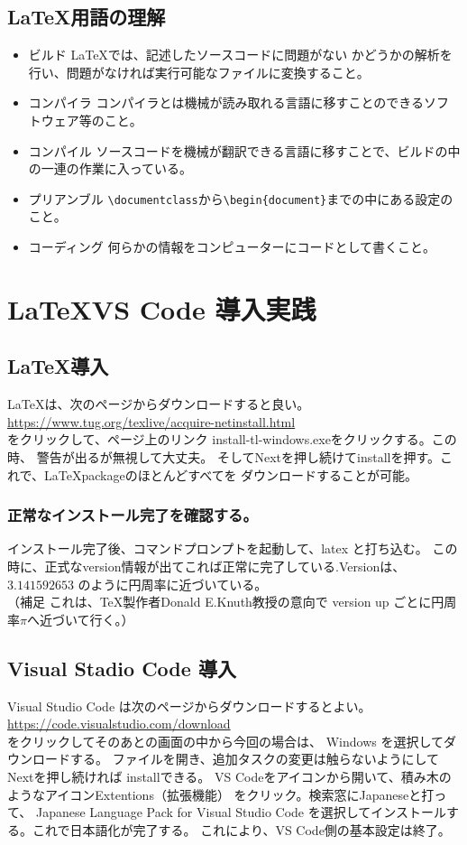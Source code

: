 \documentclass{ltjsarticle}
\begin{document}
\subsection{\LaTeX 用語の理解}
\begin{itemize}
  \item ビルド \LaTeX では、記述したソースコードに問題がない
        かどうかの解析を行い、問題がなければ実行可能なファイルに変換すること。
  \item コンパイラ コンパイラとは機械が読み取れる言語に移すことのできるソフトウェア等のこと。
  \item コンパイル ソースコードを機械が翻訳できる言語に移すことで、ビルドの中の一連の作業に入っている。
  \item プリアンブル \verb|\documentclass|から\verb|\begin{document}|までの中にある設定のこと。
  \item コーディング 何らかの情報をコンピューターにコードとして書くこと。
\end{itemize}
\section{\LaTeX VS Code 導入実践}

\subsection{\LaTeX 導入}
\LaTeX は、次のページからダウンロードすると良い。\\
\url{https://www.tug.org/texlive/acquire-netinstall.html}\\
をクリックして、ページ上のリンク install-tl-windows.exeをクリックする。この時、
警告が出るが無視して大丈夫。
そしてNextを押し続けてinstallを押す。これで、\LaTeX packageのほとんどすべてを
ダウンロードすることが可能。
\subsubsection*{正常なインストール完了を確認する。}
インストール完了後、コマンドプロンプトを起動して、latex と打ち込む。
この時に、正式なversion情報が出てこれば正常に完了している.Versionは、$3.141592653$
のように円周率に近づいている。\\
（補足 これは、\TeX 製作者Donald E.Knuth教授の意向で
version up ごとに円周率$\pi$へ近づいて行く。）
\subsection{Visual Stadio Code 導入}
Visual Studio Code は次のページからダウンロードするとよい。\\
\url{https://code.visualstudio.com/download}\\
をクリックしてそのあとの画面の中から今回の場合は、
Windows を選択してダウンロードする。
ファイルを開き、追加タスクの変更は触らないようにしてNextを押し続ければ
installできる。
VS Codeをアイコンから開いて、積み木のようなアイコンExtentions（拡張機能）
をクリック。検索窓にJapaneseと打って、
Japanese Language Pack for Visual Studio Code
を選択してインストールする。これで日本語化が完了する。
これにより、VS Code側の基本設定は終了。
\end{document}
